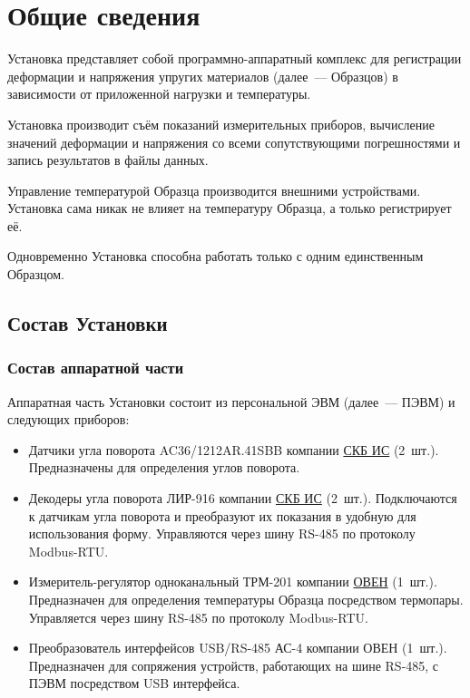 \documentclass[12pt, a4paper, twocolumn]{book}
\author{Накин~А.~В.\\\href{mailto:andrey.nakin@gmail.com}{{\tt andrey.nakin@gmail.com}}}
\begin{document}
\maketitle

\tableofcontents

\chapter{Общие сведения}

Установка представляет собой программно-аппаратный комплекс для регистрации деформации и напряжения упругих материалов (далее~--- Образцов) в зависимости от приложенной нагрузки и температуры.

Установка производит съём показаний измерительных приборов, вычисление значений деформации и напряжения со всеми сопутствующими погрешностями и запись результатов в файлы данных.

Управление температурой Образца производится внешними устройствами. Установка сама никак не влияет на температуру Образца, а только регистрирует её.

Одновременно Установка способна работать только с одним единственным Образцом.

\section{Состав Установки}

\subsection{Состав аппаратной части}

Аппаратная часть Установки состоит из персональной ЭВМ (далее~--- ПЭВМ) и следующих приборов:

\begin{itemize}

\item Датчики угла поворота AC36/1212AR.41SBB компании \href{http://www.skbis.ru/}{СКБ ИС} (2~шт.). Предназначены для определения углов поворота.

\item Декодеры угла поворота ЛИР-916 компании \href{http://www.skbis.ru/}{СКБ ИС} (2~шт.). Подключаются к датчикам угла поворота и преобразуют их показания в удобную для использования форму. Управляются через шину RS-485 по протоколу Modbus-RTU.

\item Измеритель-регулятор одноканальный ТРМ-201 компании \href{http://www.owen.ru/}{ОВЕН} (1~шт.). Предназначен для определения температуры Образца посредством термопары. Управляется через шину RS-485 по протоколу Modbus-RTU.

\item Преобразователь интерфейсов USB/RS-485 АС-4 компании ОВЕН (1~шт.). Предназначен для сопряжения устройств, работающих на шине RS-485, с  ПЭВМ посредством USB интерфейса.

\end{itemize}
\end{document}
